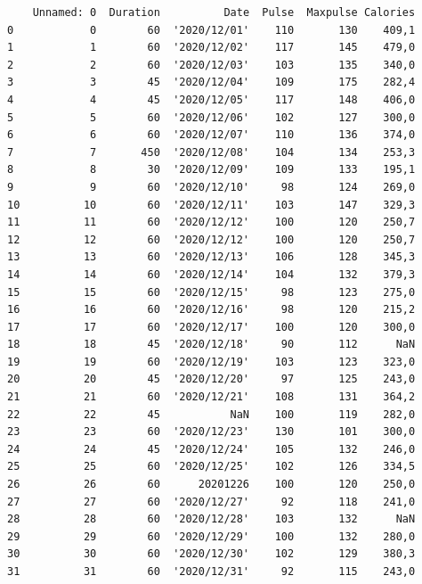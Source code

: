 \begin{code}
\begin{Shaded}
\begin{Highlighting}[]

\OperatorTok{=}\NormalTok{)}

\end{Highlighting}
\end{Shaded}

\begin{verbatim}
    Unnamed: 0  Duration          Date  Pulse  Maxpulse Calories
0            0        60  '2020/12/01'    110       130    409,1
1            1        60  '2020/12/02'    117       145    479,0
2            2        60  '2020/12/03'    103       135    340,0
3            3        45  '2020/12/04'    109       175    282,4
4            4        45  '2020/12/05'    117       148    406,0
5            5        60  '2020/12/06'    102       127    300,0
6            6        60  '2020/12/07'    110       136    374,0
7            7       450  '2020/12/08'    104       134    253,3
8            8        30  '2020/12/09'    109       133    195,1
9            9        60  '2020/12/10'     98       124    269,0
10          10        60  '2020/12/11'    103       147    329,3
11          11        60  '2020/12/12'    100       120    250,7
12          12        60  '2020/12/12'    100       120    250,7
13          13        60  '2020/12/13'    106       128    345,3
14          14        60  '2020/12/14'    104       132    379,3
15          15        60  '2020/12/15'     98       123    275,0
16          16        60  '2020/12/16'     98       120    215,2
17          17        60  '2020/12/17'    100       120    300,0
18          18        45  '2020/12/18'     90       112      NaN
19          19        60  '2020/12/19'    103       123    323,0
20          20        45  '2020/12/20'     97       125    243,0
21          21        60  '2020/12/21'    108       131    364,2
22          22        45           NaN    100       119    282,0
23          23        60  '2020/12/23'    130       101    300,0
24          24        45  '2020/12/24'    105       132    246,0
25          25        60  '2020/12/25'    102       126    334,5
26          26        60      20201226    100       120    250,0
27          27        60  '2020/12/27'     92       118    241,0
28          28        60  '2020/12/28'    103       132      NaN
29          29        60  '2020/12/29'    100       132    280,0
30          30        60  '2020/12/30'    102       129    380,3
31          31        60  '2020/12/31'     92       115    243,0
\end{verbatim}
\label{code:DataFrame2}
\end{code}

